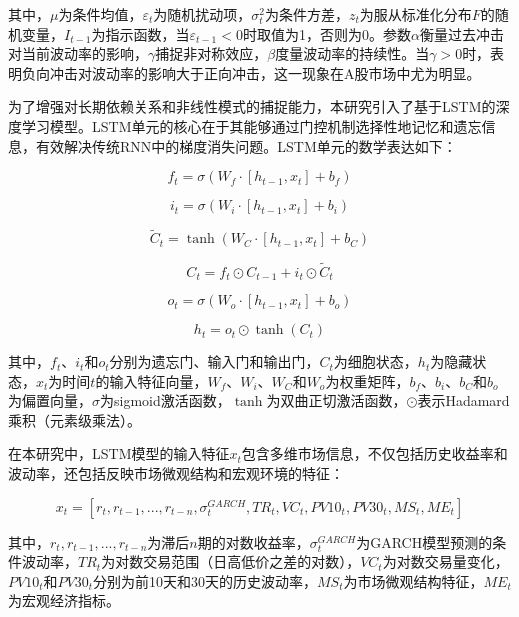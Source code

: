\documentclass[12pt, a4paper]{article}
\begin{document}
其中，$\mu$为条件均值，$\varepsilon_t$为随机扰动项，$\sigma_t^2$为条件方差，$z_t$为服从标准化分布$F$的随机变量，$I_{t-1}$为指示函数，当$\varepsilon_{t-1} < 0$时取值为1，否则为0。参数$\alpha$衡量过去冲击对当前波动率的影响，$\gamma$捕捉非对称效应，$\beta$度量波动率的持续性。当$\gamma > 0$时，表明负向冲击对波动率的影响大于正向冲击，这一现象在A股市场中尤为明显。

为了增强对长期依赖关系和非线性模式的捕捉能力，本研究引入了基于LSTM的深度学习模型。LSTM单元的核心在于其能够通过门控机制选择性地记忆和遗忘信息，有效解决传统RNN中的梯度消失问题。LSTM单元的数学表达如下：

\begin{equation}
f_t = \sigma(W_f \cdot [h_{t-1}, x_t] + b_f)
\end{equation}

\begin{equation}
i_t = \sigma(W_i \cdot [h_{t-1}, x_t] + b_i)
\end{equation}

\begin{equation}
\tilde{C}_t = \tanh(W_C \cdot [h_{t-1}, x_t] + b_C)
\end{equation}

\begin{equation}
C_t = f_t \odot C_{t-1} + i_t \odot \tilde{C}_t
\end{equation}

\begin{equation}
o_t = \sigma(W_o \cdot [h_{t-1}, x_t] + b_o)
\end{equation}

\begin{equation}
h_t = o_t \odot \tanh(C_t)
\end{equation}

其中，$f_t$、$i_t$和$o_t$分别为遗忘门、输入门和输出门，$C_t$为细胞状态，$h_t$为隐藏状态，$x_t$为时间$t$的输入特征向量，$W_f$、$W_i$、$W_C$和$W_o$为权重矩阵，$b_f$、$b_i$、$b_C$和$b_o$为偏置向量，$\sigma$为sigmoid激活函数，$\tanh$为双曲正切激活函数，$\odot$表示Hadamard乘积（元素级乘法）。

在本研究中，LSTM模型的输入特征$x_t$包含多维市场信息，不仅包括历史收益率和波动率，还包括反映市场微观结构和宏观环境的特征：

\begin{equation}
x_t = [r_t, r_{t-1}, ..., r_{t-n}, \sigma_t^{GARCH}, TR_t, VC_t, PV10_t, PV30_t, MS_t, ME_t]
\end{equation}

其中，$r_t, r_{t-1}, ..., r_{t-n}$为滞后$n$期的对数收益率，$\sigma_t^{GARCH}$为GARCH模型预测的条件波动率，$TR_t$为对数交易范围（日高低价之差的对数），$VC_t$为对数交易量变化，$PV10_t$和$PV30_t$分别为前10天和30天的历史波动率，$MS_t$为市场微观结构特征，$ME_t$为宏观经济指标。
\end{document}
